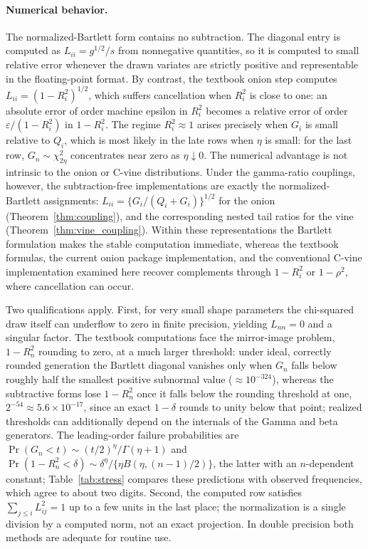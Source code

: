 \documentclass[12pt,english]{article}
\theoremstyle{plain} %
\theoremstyle{definition} %
\theoremstyle{remark} %
\newcommand{\xtab}[2]{Table~\ref{#1}}
\newcommand{\xtab}[2]{Table~#2 of the supplementary material}
\begin{document}
\paragraph{Numerical behavior.}
The normalized-Bartlett form contains no subtraction. The diagonal entry is computed as $L_{ii}=g^{1/2}/s$ from nonnegative quantities, so it is computed to small relative error whenever the drawn variates are strictly positive and representable in the floating-point format. By contrast, the textbook onion step computes $L_{ii}=(1-R_i^2)^{1/2}$, which suffers cancellation when $R_i^2$ is close to one: an absolute error of order machine epsilon in $R_i^2$ becomes a relative error of order $\varepsilon/(1-R_i^2)$ in $1-R_i^2$. The regime $R_i^2\approx1$ arises precisely when $G_i$ is small relative to $Q_i$, which is most likely in the late rows when $\eta$ is small: for the last row, $G_n\sim\chi^2_{2\eta}$ concentrates near zero as $\eta\downarrow0$. The numerical advantage is not intrinsic to the onion or C-vine distributions. Under the gamma-ratio couplings, however, the subtraction-free implementations are exactly the normalized-Bartlett assignments: $L_{ii}=\{G_i/(Q_i+G_i)\}^{1/2}$ for the onion (Theorem~\ref{thm:coupling}), and the corresponding nested tail ratios for the vine (Theorem~\ref{thm:vine_coupling}). Within these representations the Bartlett formulation makes the stable computation immediate, whereas the textbook formulas, the current onion package implementation, and the conventional C-vine implementation examined here recover complements through $1-R_i^2$ or $1-\rho^2$, where cancellation can occur.

Two qualifications apply. First, for very small shape parameters the chi-squared draw itself can underflow to zero in finite precision, yielding $L_{nn}=0$ and a singular factor. The textbook computations face the mirror-image problem, $1-R_n^2$ rounding to zero, at a much larger threshold: under ideal, correctly rounded generation the Bartlett diagonal vanishes only when $G_n$ falls below roughly half the smallest positive subnormal value ($\approx10^{-324}$), whereas the subtractive forms lose $1-R_n^2$ once it falls below the rounding threshold at one, $2^{-54}\approx5.6\times10^{-17}$, since an exact $1-\delta$ rounds to unity below that point; realized thresholds can additionally depend on the internals of the Gamma and beta generators. The leading-order failure probabilities are $\Pr(G_n<t)\sim(t/2)^{\eta}/\Gamma(\eta+1)$ and $\Pr(1-R_n^2<\delta)\sim\delta^{\eta}/\{\eta B(\eta,(n-1)/2)\}$, the latter with an $n$-dependent constant; \xtab{tab:stress}{S1} compares these predictions with observed frequencies, which agree to about two digits. Second, the computed row satisfies $\sum_{j\leq i}L_{ij}^2=1$ up to a few units in the last place; the normalization is a single division by a computed norm, not an exact projection. In double precision both methods are adequate for routine use.
\end{document}
